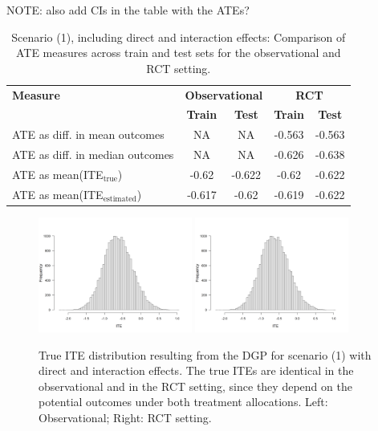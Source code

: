 NOTE: also add CIs in the table with the ATEs?

\begin{table}[htbp]
\centering
\caption{Scenario (1), including direct and interaction effects: Comparison of ATE measures across train and test sets for the observational and RCT setting.}
\label{tab:scenario1_ate_comparison}
\begin{tabular}{l c c c c}
\toprule
\textbf{Measure} & \multicolumn{2}{c}{\textbf{Observational}} & \multicolumn{2}{c}{\textbf{RCT}} \\
\cmidrule(lr){2-3} \cmidrule(lr){4-5}
 & \textbf{Train} & \textbf{Test} & \textbf{Train} & \textbf{Test} \\
\midrule
ATE as diff. in mean outcomes & NA & NA & -0.563 & -0.563 \\
ATE as diff. in median outcomes & NA & NA & -0.626 & -0.638 \\
ATE as mean(ITE$_\text{true}$)  & -0.62 & -0.622 & -0.62 & -0.622 \\
ATE as mean(ITE$_\text{estimated}$) & -0.617 & -0.62 & -0.619 & -0.622 \\
\bottomrule
\end{tabular}
\end{table}



\begin{figure}[htbp]
\centering
\includegraphics[width=0.45\textwidth]{img/results/observ_scenario1_ite_distribution_dgp.png}
\includegraphics[width=0.45\textwidth]{img/results/rct_scenario1_ite_distribution_dgp.png}
\caption{True ITE distribution resulting from the DGP for scenario (1) with direct and interaction effects. The true ITEs are identical in the observational and in the RCT setting, since they depend on the potential outcomes under both treatment allocations. Left: Observational; Right: RCT setting.}
\label{fig:scenario1_ite_distribution_dgp}
\end{figure}



